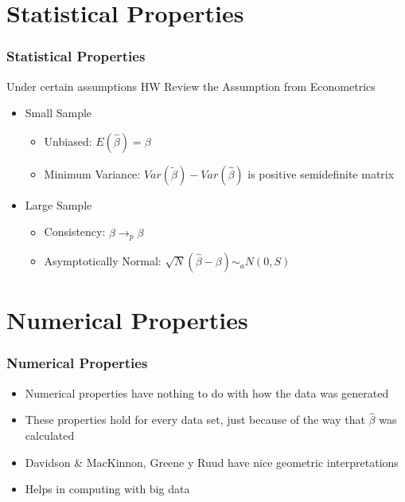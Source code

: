 \documentclass[
  shownotes,
  xcolor={svgnames},
  hyperref={colorlinks,citecolor=DarkBlue,linkcolor=DarkRed,urlcolor=DarkBlue}
  ]{beamer}
\begin{document}
\section{Statistical Properties}
\begin{frame}
\frametitle{Statistical Properties}

Under certain assumptions {\tiny HW Review the Assumption from Econometrics}
\bigskip
\begin{itemize}
  \item Small Sample
  \begin{itemize}
    \item Unbiased: $E(\hat \beta) = \beta$
    \medskip
    \item Minimum Variance: $Var(\tilde \beta) - Var(\hat \beta)$ is positive semidefinite matrix
  \end{itemize}
\bigskip  
  \item Large Sample
  \begin{itemize}
    \item Consistency: $\hat \beta \rightarrow_p \beta$
    \medskip
    \item Asymptotically Normal: $\sqrt{N}(\hat \beta -\beta) \sim_a N(0,S)$
  \end{itemize}

\end{itemize}
\end{frame}
\section{Numerical Properties}
\begin{frame}
\frametitle{Numerical Properties}

\begin{itemize}
  \item Numerical properties have nothing to do with how the data was generated
  \bigskip
  \item These properties hold for every data set, just because of the way that $\hat \beta$ was calculated
  \bigskip
  \item Davidson \& MacKinnon, Greene y Ruud have nice geometric interpretations
  \bigskip
  \item Helps in computing with big data
  
\end{itemize}
\end{frame}
\end{document}
